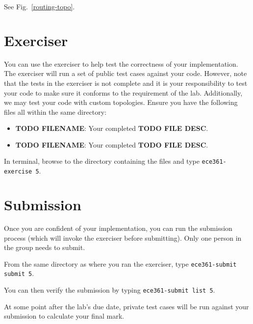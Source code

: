 \documentclass[11pt]{article}
\def\thelab{5}
\begin{document}
See Fig.~\ref{routing-topo}.


\section{Exerciser}
\label{sec:exercise}
You can use the exerciser to help test the correctness of your implementation.
The exerciser will run a set of public test cases against your code.
However, note that the tests in the exerciser is not complete and it is your responsibility to test your code to make sure it conforms to the requirement of the lab.
Additionally, we may test your code with custom topologies.
Ensure you have the following files all within the same directory:
\begin{itemize}
    \item \textbf{TODO FILENAME}: Your completed \textbf{TODO FILE DESC}.
    \item \textbf{TODO FILENAME}: Your completed \textbf{TODO FILE DESC}.
\end{itemize}

In terminal, browse to the directory containing the files and type \texttt{ece361-exercise \thelab}.


\section{Submission}
\label{sec:submission}
Once you are confident of your implementation, you can run the submission process (which will invoke the exerciser before submitting).
Only one person in the group needs to submit.

From the same directory as where you ran the exerciser, type \texttt{ece361-submit submit \thelab}.

You can then verify the submission by typing \texttt{ece361-submit list \thelab}.

At some point after the lab's due date, private test cases will be run against your submission to calculate your final mark.
\end{document}
